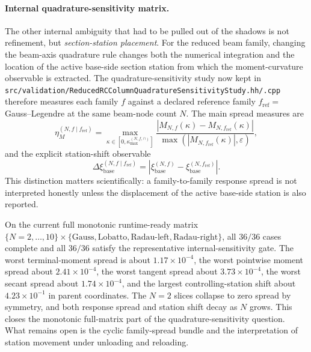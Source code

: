\paragraph{Internal quadrature-sensitivity matrix.}
The other internal ambiguity that had to be pulled out of the shadows is not
refinement, but \emph{section-station placement}. For the reduced beam family,
changing the beam-axis quadrature rule changes both the numerical integration
and the location of the active base-side section station from which the
moment-curvature observable is extracted. The quadrature-sensitivity study now
kept in
\texttt{src/validation/ReducedRCColumnQuadratureSensitivityStudy.hh/.cpp}
therefore measures each family \(f\) against a declared reference family
\(f_{\mathrm{ref}}=\) Gauss--Legendre at the same beam-node count \(N\). The
main spread measures are
\begin{equation}
  \eta_{M}^{(N,f\mid f_{\mathrm{ref}})}
  =
  \max_{\kappa \in [0,\kappa_{\max}^{(N,f,\cap)}]}
  \frac{|M_{N,f}(\kappa)-M_{N,f_{\mathrm{ref}}}(\kappa)|}
       {\max(|M_{N,f_{\mathrm{ref}}}(\kappa)|,\varepsilon)},
\end{equation}
and the explicit station-shift observable
\begin{equation}
  \Delta \xi_{\mathrm{base}}^{(N,f\mid f_{\mathrm{ref}})}
  =
  \left|
    \xi_{\mathrm{base}}^{(N,f)} -
    \xi_{\mathrm{base}}^{(N,f_{\mathrm{ref}})}
  \right|.
\end{equation}
This distinction matters scientifically: a family-to-family response spread is
not interpreted honestly unless the displacement of the active base-side
station is also reported.

On the current full monotonic runtime-ready matrix
\(\{N=2,\dots,10\}\times\{\text{Gauss},\text{Lobatto},\text{Radau-left},\text{Radau-right}\}\),
all \(36/36\) cases complete and all \(36/36\) satisfy the representative
internal-sensitivity gate. The worst terminal-moment spread is about
\(1.17\times 10^{-4}\), the worst pointwise moment spread about
\(2.41\times 10^{-4}\), the worst tangent spread about
\(3.73\times 10^{-4}\), the worst secant spread about
\(1.74\times 10^{-4}\), and the largest controlling-station shift about
\(4.23\times 10^{-1}\) in parent coordinates. The \(N=2\) slices collapse to
zero spread by symmetry, and both response spread and station shift decay as
\(N\) grows. This closes the monotonic full-matrix part of the
quadrature-sensitivity question. What remains open is the cyclic
family-spread bundle and the interpretation of station movement under
unloading and reloading.

